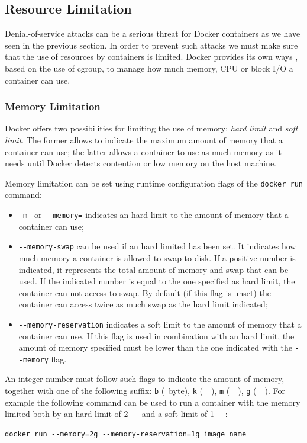 \documentclass[a4paper,12pt]{article}
\newcommand{\code}[1]{\lstinline|#1|}
\begin{document}
\subsection{Resource Limitation}

Denial-of-service attacks can be a serious threat for Docker containers as we
have seen in the previous section. In order to prevent such attacks we must make
sure that the use of resources by containers is limited. Docker provides its own
ways \cite{resource_on_docker}, based on the use of cgroup, to manage
how much memory, CPU or block I/O a container can use.

\subsubsection{Memory Limitation}

Docker offers two possibilities for limiting the use of memory: \textit{hard
limit} and \textit{soft limit}. The former allows to indicate the maximum amount
of memory that a container can use; the latter allows a container to
use as much memory as it needs until Docker detects contention or low memory on
the host machine. \par Memory limitation can be set using runtime configuration
flags of the \code{docker run} command: 
\begin{itemize}
  \item \code{-m } or \code{--memory=} indicates an hard limit to the amount
  of memory that a container can use;
  \item \code{--memory-swap} can be used if an hard limited has been set. It
  indicates how much memory a container is allowed to swap to disk. If a
  positive number is indicated, it represents the total amount of memory and
  swap that can be used. If the indicated number is equal to the one specified
  as hard limit, the container can not access to swap. By default (if this flag is
  unset) the container can access twice as much swap as the hard limit indicated;
  \item \code{--memory-reservation} indicates a soft limit to the amount
  of memory that a container can use. If this flag is used in combination with
  an hard limit, the amount of memory specified must be lower than the one
  indicated with the \code{--memory} flag.
\end{itemize}
An integer number must follow such flags to indicate the amount of memory,
together with one of the following suffix: \code{b} (\SI{}{byte}), \code{k}
(\SI{}{\kilo\byte}), \code{m} (\SI{}{\mega\byte}), \code{g} (\SI{}{\giga\byte}).
For example the following command can be used to run a container with the memory
limited both by an hard limit of 2 \SI{}{\giga\byte} and a soft limit of 1
\SI{}{\giga\byte}:
\begin{lstlisting}
docker run --memory=2g --memory-reservation=1g image_name
\end{lstlisting}
  
\end{document}
